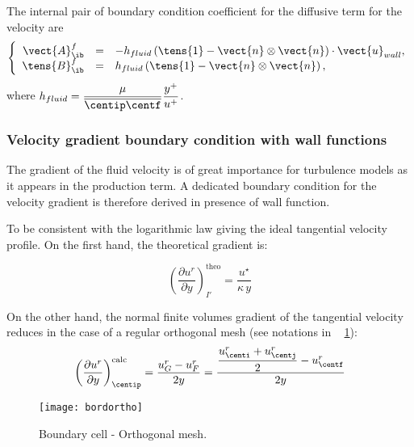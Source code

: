 The internal pair of boundary condition coefficient for the diffusive term for the velocity are 
\begin{equation}
\left\lbrace
\begin{array}{r c l}
\vect{A}^f_\ib & = & -h_{fluid}  \left(\tens{1} - \vect{n} \otimes \vect{n} \right) \cdot  \vect{u}_{wall}, \\
\tens{B}^f_\ib & = & h_{fluid}  \left(\tens{1} - \vect{n} \otimes \vect{n} \right),
\end{array}
\right.
\end{equation}
where $h_{fluid} = \dfrac{\mu}{\overline{\centip \centf} } \dfrac{y^+}{u^+} $.

\subsubsection{Velocity gradient boundary condition with wall functions}
The gradient of the fluid velocity is of great importance for turbulence models
as it appears in the production term. A dedicated boundary condition for the velocity gradient is therefore derived in presence of wall function. 

To be consistent with the logarithmic law giving the ideal tangential 
velocity profile. On the first hand, the theoretical gradient is:

\begin{equation}\label{eq:bndcnd:vel_grad_wallf_theo}
\left( \dfrac{\partial u^r}{\partial y}\right)_{I'}^\textrm{theo} =\dfrac{u^\star}{\kappa \, y}
\end{equation}

On the other hand,
the normal finite volumes gradient of the tangential velocity reduces in the case 
of a regular orthogonal mesh  (see notations in \figurename~ 
\ref{fig:bndcnd:boundary_cell_ortho_mesh}):  
\begin{equation}\label{eq:bndcnd:vel_grad_wallf_calc}
\left( \dfrac{\partial u^r}{\partial y}\right)_{\centip}^\textrm{calc} = \dfrac{u_{G}^r - u_{F}^r}{2y} =
 \dfrac{\dfrac{u_{\centi}^r+u_{\centj}^r}{2} -  u_{\centf}^r}{2y}
\end{equation}

\begin{figure}[!htbp]
\centering
\texttt{[image: bordortho]}
\caption{\label{fig:bndcnd:boundary_cell_ortho_mesh}Boundary cell - Orthogonal mesh.}
\end{figure}

